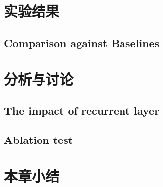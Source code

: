 \section{实验结果}
\label{sec:ran_exper_result}
\subsection{Comparison against Baselines}

\section{分析与讨论}
\label{sec:ran_analysis}
\subsection{The impact of recurrent layer}

\subsection{Ablation test}

\section{本章小结}
\label{sec:ran_conclu}

